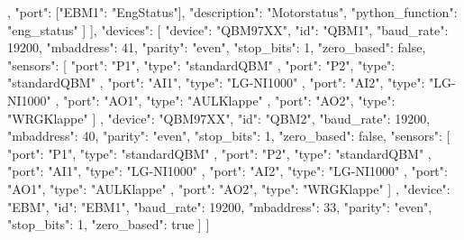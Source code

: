 \begin{jsoncode}
{{{          },
          {
            "port": [{"EBM1": "EngStatus"}],
            "description": "Motorstatus",
            "python_function": "eng_status"
          }
        ]
      }
    ],
    "devices": [
      {
        "device": "QBM97XX",
        "id": "QBM1",
        "baud_rate": 19200,
        "mbaddress": 41,
        "parity": "even",
        "stop_bits": 1,
        "zero_based": false,
        "sensors": [
          {
            "port": "P1",
            "type": "standardQBM"
          },
          {
            "port": "P2",
            "type": "standardQBM"
          },
          {
            "port": "AI1",
            "type": "LG-NI1000"
          },
          {
            "port": "AI2",
            "type": "LG-NI1000"
          },
          {
            "port": "AO1",
            "type": "AULKlappe"
          },
          {
            "port": "AO2",
            "type": "WRGKlappe"
          }
        ]
      },
      {
        "device": "QBM97XX",
        "id": "QBM2",
        "baud_rate": 19200,
        "mbaddress": 40,
        "parity": "even",
        "stop_bits": 1,
        "zero_based": false,
        "sensors": [
          {
            "port": "P1",
            "type": "standardQBM"
          },
          {
            "port": "P2",
            "type": "standardQBM"
          },
          {
            "port": "AI1",
            "type": "LG-NI1000"
          },
          {
            "port": "AI2",
            "type": "LG-NI1000"
          },
          {
            "port": "AO1",
            "type": "AULKlappe"
          },
          {
            "port": "AO2",
            "type": "WRGKlappe"
          }
        ]
      },
      {
        "device": "EBM",
        "id": "EBM1",
        "baud_rate": 19200,
        "mbaddress": 33,
        "parity": "even",
        "stop_bits": 1,
        "zero_based": true
      }
    ]
  }
]
\end{jsoncode}
